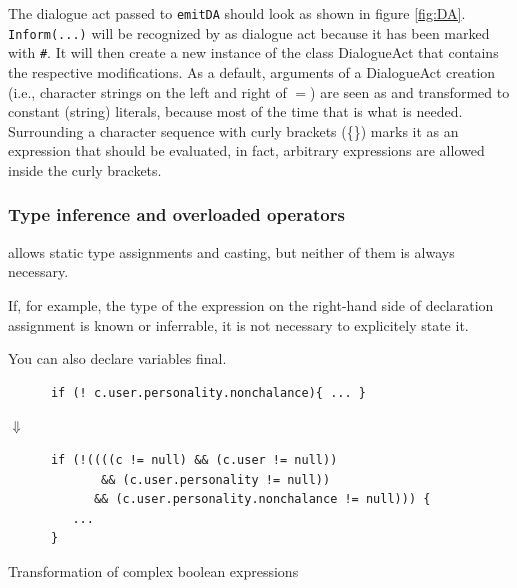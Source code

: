 The dialogue act passed to \texttt{emitDA} should look as shown in figure \ref{fig:DA}. \texttt{Inform}\verb|(...)| will be recognized by \vonda as dialogue act because it has been marked with \verb|#|. It will then create a new instance of the class DialogueAct that contains the respective modifications. As a default, arguments of a DialogueAct creation (i.e., character strings on the left and right of $=$) are seen as and transformed to constant (string) literals, because most of the time that is what is needed.
Surrounding a character sequence with curly brackets (\{\}) marks it as an
expression that should be evaluated, in fact, arbitrary expressions are allowed
inside the curly brackets.

\subsubsection{Type inference and overloaded operators}
\label{sec:typeinference}

%
\vonda allows static type assignments and casting, but neither of them is always necessary.


If, for example, the type of the expression on the right-hand side of declaration assignment is known or inferrable, it is not necessary to explicitely state it.

You can also declare variables final.

\begin{table}[htbp]
  \centering
  \begin{small}
    \begin{lstlisting}
      if (! c.user.personality.nonchalance){ ... }
    \end{lstlisting}

    {\Large$\Downarrow$}\\

    \begin{lstlisting}
      if (!((((c != null) && (c.user != null))
             && (c.user.personality != null))
            && (c.user.personality.nonchalance != null))) {
         ...
      }
\end{lstlisting}
\end{small}

\caption{Transformation of complex boolean expressions}
\label{tab:multi-predaccess}
\end{table}
\vspace*{10pt}

